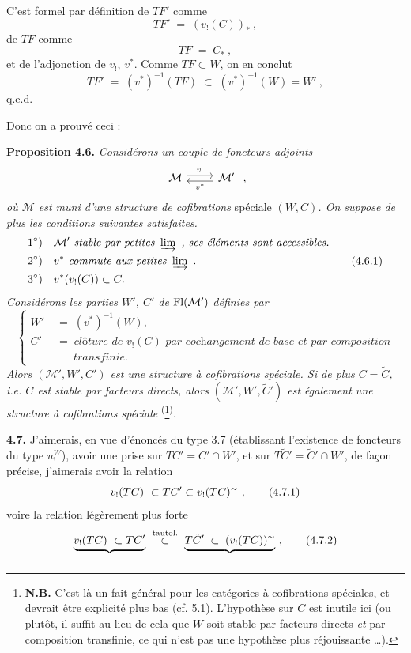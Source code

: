C'est formel par définition de $TF'$ comme
\[
TF' \;=\; (v_!(C))_*\ ,
\]
de $TF$ comme
\[
TF \;=\; C_*\ ,
\]
et de l'adjonction de $v_!$, $v^*$. Comme $TF \subset W$, on en conclut
\[
TF' \;=\; (v^*)^{-1}(TF) \;\subset\; (v^*)^{-1}(W) = W'\ ,
\]
q.e.d.

Donc on a prouvé ceci :

\textbf{Proposition 4.6.} \textit{Considérons un couple de foncteurs adjoints}
\[
\begin{tikzcd}
\mathcal{M} \arrow[r, shift left, "v_!"] & \mathcal{M}' \arrow[l, shift left, "v^*"]
\end{tikzcd}
\ ,
\]
\textit{où $\mathcal{M}$ est muni d'une structure de cofibrations} spéciale $(W, C)$\textit{. On suppose de plus les conditions suivantes satisfaites.}
\[
\begin{aligned}
&1^\circ)\quad \mathcal{M}' \textit{ stable par petites } \varinjlim\ \textit{, ses éléments sont accessibles.} \\
&2^\circ)\quad v^* \textit{ commute aux petites } \varinjlim\ . \\
&3^\circ)\quad v^*(v_!(C)) \subset C.
\end{aligned} \tag*{(4.6.1)}
\]
\textit{Considérons les parties $W'$, $C'$ de} $\operatorname{Fl}(\mathcal{M}')$ \textit{définies par}
\[
\left\{
\begin{aligned}
W' \;&=\; (v^*)^{-1}(W), \\
C' \;&=\; \textit{clôture de } v_!(C) \textit{ par cochangement de base et par composition} \\
&\phantom{\;=\;}\ \textit{transfinie.}
\end{aligned}
\right. \tag*{(4.6.2)}
\]
\textit{Alors $(\mathcal{M}', W', C')$ est une structure à cofibrations spéciale. Si de plus $C = \tilde{C}$, i.e. $C$ est stable par facteurs directs, alors $(\mathcal{M}', W', \tilde{C}')$ est également une structure à cofibrations spéciale} \textsuperscript{(}\footnote[20]{\textbf{N.B.} C'est là un fait général pour les catégories à cofibrations spéciales, et devrait être explicité plus bas (cf. 5.1). L'hypothèse sur $C$ est inutile ici (ou plutôt, il suffit au lieu de cela que $W$ soit stable par facteurs directs \textit{et} par composition transfinie, ce qui n'est pas une hypothèse plus réjouissante \dots).}\textsuperscript{)}.

\textbf{4.7.} J'aimerais, en vue d'énoncés du type 3.7 (établissant l'existence de foncteurs du type $u_!^W$), avoir une prise sur $TC' = C'{\cap}W'$, et sur $T\tilde{C}' = \tilde{C}'{\cap}W'$, de façon précise, j'aimerais avoir la relation
\[
v_!(TC)\ \subset TC' \subset v_!(TC)^{\sim}\ , \tag*{(4.7.1)}
\]
voire la relation légèrement plus forte
\[
\underbrace{v_!(TC)\ \subset TC'}_{} \ \overset{\text{tautol.}}{\subset}\ \underbrace{T\tilde{C}' \;\subset\; (v_!(TC))\postilde}_{}\ , \tag*{(4.7.2)}
\]

